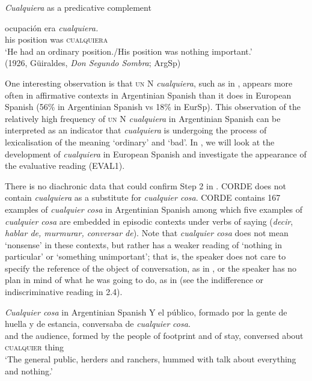 \ea \label{bkm:Ref150787886} %
\textit{Cualquiera} as a predicative complement

     {ocupación} {era} \textit{cualquiera.}\\
    his position was \textsc{cualquiera}\\
    \glt ‘He had an ordinary position./His position was nothing important.’\\
{(1926, Güiraldes,} {\textit{Don Segundo Sombra}}{; ArgSp)}
\z

One interesting observation is that \textsc{un} N \textit{cualquiera}, such as in , appears more often in affirmative contexts in Argentinian Spanish than it does in European Spanish (56\% in Argentinian Spanish vs 18\% in EurSp). This observation of the relatively high frequency of \textsc{un} N \textit{cualquiera} in Argentinian Spanish can be interpreted as an indicator that \textit{cualquiera} is undergoing the process of lexicalisation of the meaning ‘ordinary’ and ‘bad’. In , we will look at the development of \textit{cualquiera} in European Spanish and investigate the appearance of the evaluative reading (EVAL1).

There is no diachronic data that could confirm Step 2 in . CORDE does not contain \textit{cualquiera} as a substitute for \textit{cualquier cosa}. CORDE contains 167 examples of \textit{cualquier cosa} in Argentinian Spanish among which five examples of \textit{cualquier cosa} are embedded in episodic contexts under verbs of saying (\textit{decir}, \textit{hablar de, murmurar, conversar de}). Note that \textit{cualquier cosa} does not mean ‘nonsense’ in these contexts, but rather has a weaker reading of ‘nothing in particular’ or ‘something unimportant’; that is, the speaker does not care to specify the reference of the object of conversation, as in , or the speaker has no plan in mind of what he was going to do, as in  (see the indifference or indiscriminative reading in 2.4).

\ea \label{ex:key:271} %

  \textit{Cualquier cosa} in Argentinian Spanish
\ea \label{ex:key:271-1} \gll Y el público, formado por la gente de huella y de estancia, conversaba de \textit{cualquier} \textit{cosa}.\\
and the audience, formed by the people of footprint and of stay, conversed about \textsc{cualquier} thing\\
    \glt ‘The general public, herders and ranchers, hummed with talk about everything and nothing.’

